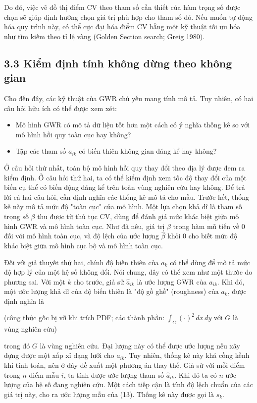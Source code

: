 Do đó, việc vẽ đồ thị điểm CV theo tham số cần thiết của hàm trọng số được chọn sẽ giúp định hướng chọn giá trị phù hợp cho tham số đó. Nếu muốn tự động hóa quy trình này, có thể cực đại hóa điểm CV bằng một kỹ thuật tối ưu hóa như tìm kiếm theo tỉ lệ vàng (Golden Section search; Greig 1980).

\subsection{3.3 Kiểm định tính không dừng theo không gian}

Cho đến đây, các kỹ thuật của GWR chủ yếu mang tính mô tả. Tuy nhiên, có hai câu hỏi hữu ích có thể được xem xét:

\begin{itemize}
\item
  Mô hình GWR có mô tả dữ liệu tốt hơn một cách có ý nghĩa thống kê so với mô hình hồi quy toàn cục hay không?
\item
  Tập các tham số \(a_{ik}\) có biến thiên không gian đáng kể hay không?
\end{itemize}

Ở câu hỏi thứ nhất, toàn bộ mô hình hồi quy thay đổi theo địa lý được đem ra kiểm định. Ở câu hỏi thứ hai, ta có thể kiểm định xem tốc độ thay đổi của một biến cụ thể có biến động đáng kể trên toàn vùng nghiên cứu hay không. Để trả lời cả hai câu hỏi, cần định nghĩa các thống kê mô tả cho mẫu. Trước hết, thống kê này mô tả mức độ "toàn cục" của mô hình. Một lựa chọn khả dĩ là tham số trọng số \(\beta\) thu được từ thủ tục CV, dùng để đánh giá mức khác biệt giữa mô hình GWR và mô hình toàn cục. Như đã nêu, giá trị \(\beta\) trong hàm mũ tiến về 0 đối với mô hình toàn cục, và độ lệch của ước lượng \(\hat{\beta}\) khỏi 0 cho biết mức độ khác biệt giữa mô hình cục bộ và mô hình toàn cục.

Đối với giả thuyết thứ hai, chính độ biến thiên của \(a_k\) có thể dùng để mô tả mức độ hợp lý của một hệ số không đổi. Nói chung, đây có thể xem như một thước đo phương sai. Với một \(k\) cho trước, giả sử \(\hat{a}_{ik}\) là ước lượng GWR của \(a_{ik}\). Khi đó, một ước lượng khả dĩ của độ biến thiên là "độ gồ ghề" (roughness) của \(a_k\), được định nghĩa là

(công thức gốc bị vỡ khi trích PDF; các thành phần: \(\int_G (\cdot)^2\,dx\,dy\) với \(G\) là vùng nghiên cứu)

trong đó \(G\) là vùng nghiên cứu. Đại lượng này có thể được ước lượng nếu xây dựng được một xấp xỉ dạng lưới cho \(a_{ik}\). Tuy nhiên, thống kê này khá cồng kềnh khi tính toán, nên ở đây đề xuất một phương án thay thế. Giả sử với mỗi điểm trong \(n\) điểm mẫu \(i\), ta tính được ước lượng tham số \(\hat{a}_{ik}\). Khi đó ta có \(n\) ước lượng của hệ số đang nghiên cứu. Một cách tiếp cận là tính độ lệch chuẩn của các giá trị này, cho ra ước lượng mẫu của (13). Thống kê này được gọi là \(s_k\).

